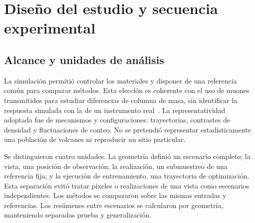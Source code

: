 \section{Diseño del estudio y secuencia experimental}\label{sec:met-diseno}
\subsection{Alcance y unidades de análisis}
La simulación permitió controlar los materiales y disponer de una referencia común para comparar métodos. Esta elección es coherente con el uso de muones transmitidos para estudiar diferencias de columna de masa, sin identificar la respuesta simulada con la de un instrumento real~\parencite{bonomi2020,lesparre2010}. La representatividad adoptada fue de mecanismos y configuraciones: trayectorias, contrastes de densidad y fluctuaciones de conteo. No se pretendió representar estadísticamente una población de volcanes ni reproducir un sitio particular.

Se distinguieron cuatro unidades. La geometría definió un escenario completo; la vista, una posición de observación; la realización, un submuestreo de una referencia fija; y la ejecución de entrenamiento, una trayectoria de optimización. Esta separación evitó tratar píxeles o realizaciones de una vista como escenarios independientes. Los métodos se compararon sobre las mismas entradas y referencias. Los resúmenes entre escenarios se calcularon por geometría, manteniendo separadas prueba y generalización.

